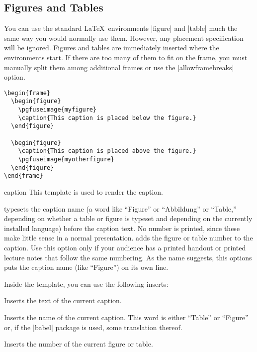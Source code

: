 \subsection{Figures and Tables}

You can use the standard \LaTeX\ environments |figure| and |table| much the same way you would normally use them. However, any placement specification will be ignored. Figures and tables are immediately inserted where the environments start. If there are too many of them to fit on the frame, you must manually split them among additional frames or use the |allowframebreaks| option.

\example
\begin{verbatim}
\begin{frame}
  \begin{figure}
    \pgfuseimage{myfigure}
    \caption{This caption is placed below the figure.}
  \end{figure}

  \begin{figure}
    \caption{This caption is placed above the figure.}
    \pgfuseimage{myotherfigure}
  \end{figure}
\end{frame}
\end{verbatim}

\begin{element}{caption}\yes\yes\yes
  This template is used to render the caption.
  \begin{templateoptions}
    typesets the caption name (a word like ``Figure'' or ``Abbildung'' or ``Table,'' depending on whether a table or figure is typeset and depending on the currently installed language) before the caption text. No number is printed, since these make little sense in a normal presentation.
    adds the figure or table number to the caption. Use this option only if your audience has a printed handout or printed lecture notes that follow the same numbering.
    As the name suggests, this options puts the caption name (like ``Figure'') on its own line.
  \end{templateoptions}

  Inside the template, you can use the following inserts:
  \begin{itemize}
    \iteminsert{\insertcaption}
    Inserts the text of the current caption.

    \iteminsert{\insertcaptionname}
    Inserts the name of the current caption. This word is either ``Table'' or ``Figure'' or, if the |babel| package is used, some translation thereof.

    \iteminsert{\insertcaptionnumber}
    Inserts the number of the current figure or table.
  \end{itemize}
\end{element}

